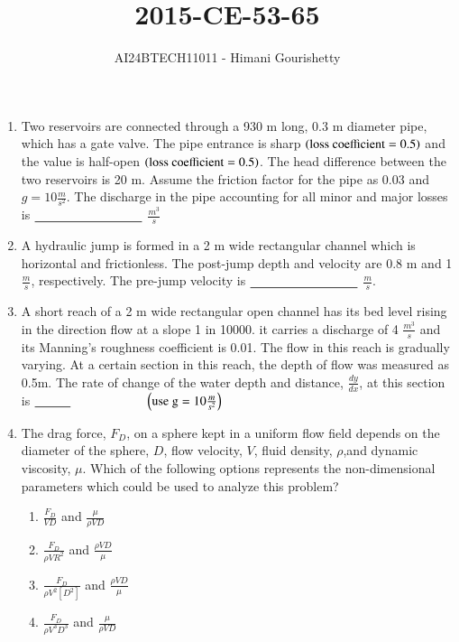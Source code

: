 \documentclass[journal,12pt,onecolumn]{IEEEtran}
\theoremstyle{remark}
\begin{document}

\vspace{3cm}

\title{2015-CE-53-65}
\author{AI24BTECH11011 - Himani Gourishetty}
\maketitle
\bigskip

\renewcommand{\thefigure}{\theenumi}
\renewcommand{\thetable}{\theenumi}
\begin{enumerate}


\item Two reservoirs are connected through a 930 m long, 0.3 m diameter pipe, which has a gate valve. The pipe entrance is sharp $\left(\text{loss coefficient} = 0.5\right)$ and the value is half-open $\left(\text{loss coefficient} = 0.5\right)$. The head difference between the two reservoirs is 20 m. Assume the friction factor for the pipe as 0.03 and $g = 10 \frac{m}{s^2}$. The discharge in the pipe accounting for all minor and major losses is $\makebox[3cm][l]{\underline{\hspace{3cm}}}$ $\frac{m^3}{s}$

\item A hydraulic jump is formed in a 2 m wide rectangular channel which is horizontal and frictionless. The post-jump depth and velocity are 0.8 m and 1 $\frac{m}{s}$, respectively. The pre-jump velocity is $\makebox[3cm][l]{\underline{\hspace{3cm}}}$ $\frac{m}{s}$. 

\item A short reach of a 2 m wide rectangular open channel has its bed level rising in the direction flow at a slope 1 in 10000. it carries a discharge of 4 $\frac{m^3}{s}$ and its Manning's roughness coefficient is 0.01. The flow in this reach is gradually varying. At a certain section in this reach, the depth of flow was measured as 0.5m. The rate of change of the water depth and distance, $\frac{dy}{dx}$, at this section is $\makebox[3cm][l]{\underline{\hspace{1cm}}}$ $\left(\text{use g} = 10 \frac{m}{s^2}\right)$

\item The drag force, $F_D$, on a sphere kept in a uniform flow field depends on the diameter of the sphere, $D$, flow velocity, $V$, fluid density, $\rho$,and dynamic viscosity, $\mu$. Which of the following options represents the non-dimensional parameters which could be used to analyze this problem?
\begin{enumerate}
    \item $\frac{F_D}{VD}$ and $\frac{\mu}{{\rho}VD}$
    \item $\frac{F_D}{{\rho}V{R^2}}$ and $\frac{{\rho}VD}{\mu}$
    \item $\frac{F_D}{{\rho}{V^2}[D^2]}$ and $\frac{{\rho}VD}{\mu}$
    \item $\frac{F_D}{{\rho}{V^3}{D^3}}$ and $\frac{\mu}{{\rho}VD}$


\end{enumerate}
\end{enumerate}
\end{document}
